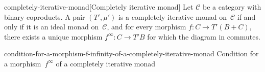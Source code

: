 \documentclass[copyright,creativecommons]{eptcs}
\newcommand{\edges}{\AtBeginMath\scriptstyle}
\newcommand{\id}{\mathrm{id}}
\begin{document}
\begin{extdefinition}{completely-iterative-monad}[Completely iterative monad]
Let $𝒞$ be a category with binary coproducts. A pair $(T′, μ′)$ is a completely
iterative monad on~$𝒞$ if and only if it is an ideal monad on~$𝒞$, and for every
morphism $f : C → T′(B + C)$, there exists a unique morphism $f^∞ : C → T′B$ for
which the diagram in
commutes.
\end{extdefinition}
\begin{extfigure}{condition-for-a-morphism-f-infinity-of-a-completely-iterative-monad}
                 {Condition for a morphism~$f^∞$ of a completely iterative monad}


\end{extfigure}
\end{document}

